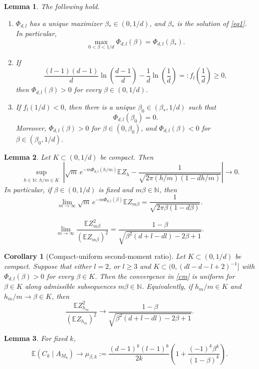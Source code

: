 \documentclass[10pt,a4paper]{amsart}
\newtheorem{lemma}{Lemma}
\newtheorem{corollary}{Corollary}
\begin{document}
\begin{lemma}\label{lm21}
The following hold.
\begin{enumerate}
\item $\Phi_{d,l}$ has a unique maximizer $\beta_*\in(0,1/d)$, and $\beta_*$ is the solution of \eqref{eq1}.  In particular,
\[
\max_{0<\beta<1/d}\Phi_{d,l}(\beta)=\Phi_{d,l}(\beta_*).
\]
\item If
\[
\frac{(l-1)(d-1)}{d}\ln\left(\frac{d-1}{d}\right)
-\frac1d\ln\left(\frac1d\right)
=:f_l\left(\frac1d\right)\geq 0,
\]
then $\Phi_{d,l}(\beta)>0$ for every $\beta\in(0,1/d)$.
\item If $f_l(1/d)<0$, then there is a unique $\beta_0\in(\beta_*,1/d)$ such that
\[
\Phi_{d,l}(\beta_0)=0.
\]
Moreover, $\Phi_{d,l}(\beta)>0$ for $\beta\in(0,\beta_0)$, and $\Phi_{d,l}(\beta)<0$ for $\beta\in(\beta_0,1/d)$.
\end{enumerate}
\end{lemma}

\begin{lemma}\label{lem:first-moment-local}
Let $K\subset(0,1/d)$ be compact.  Then
\[
\sup_{\substack{h\in\mathbb{N}:\ h/m\in K}}
\left|
\sqrt{m}\,e^{-m\Phi_{d,l}(h/m)}\mathbb{E}Z_h
-\frac{1}{\sqrt{2\pi(h/m)(1-dh/m)}}
\right|\longrightarrow 0.
\]
In particular, if $\beta\in(0,1/d)$ is fixed and $m\beta\in\mathbb{N}$, then
\[
\lim_{m\to\infty}\sqrt{m}\,e^{-m\Phi_{d,l}(\beta)}\mathbb{E}Z_{m\beta}
=\frac{1}{\sqrt{2\pi\beta(1-d\beta)}}.
\]
\end{lemma}

\begin{equation}
\lim_{m\to\infty}
\frac{\mathbb E Z_{m\beta}^2}{(\mathbb E Z_{m\beta})^2}
=\frac{1-\beta}{\sqrt{\beta^2(d+l-dl)-2\beta+1}}.
\label{cm}
\end{equation}

\begin{corollary}[Compact-uniform second-moment ratio]\label{cor:uniform-second-ratio-L1}
Let $K\subset(0,1/d)$ be compact.  Suppose that either $l=2$, or $l\ge3$ and
$K\subset(0,(dl-d-l+2)^{-1}]$ with $\Phi_{d,l}(\beta)>0$ for every $\beta\in K$.
Then the convergence in \eqref{cm} is uniform for $\beta\in K$ along admissible
subsequences $m\beta\in\mathbb N$.  Equivalently, if $h_m/m\in K$ and
$h_m/m\to\beta\in K$, then
\[
  \frac{\mathbb E Z_{h_m}^2}{(\mathbb E Z_{h_m})^2}
  \longrightarrow
  \frac{1-\beta}{\sqrt{\beta^2(d+l-dl)-2\beta+1}}.
\]
\end{corollary}

\begin{lemma}\label{l30}
For fixed \(k\),
\begin{equation}\label{eq:cond-cycle-mean}
  \mathbb E(C_k\mid A_{M_0})
  \longrightarrow
  \mu_{\beta,k}
  :=\frac{(d-1)^k(l-1)^k}{2k}
    \left(1+\frac{(-1)^k\beta^k}{(1-\beta)^k}\right).
\end{equation}
\end{lemma}
\end{document}

